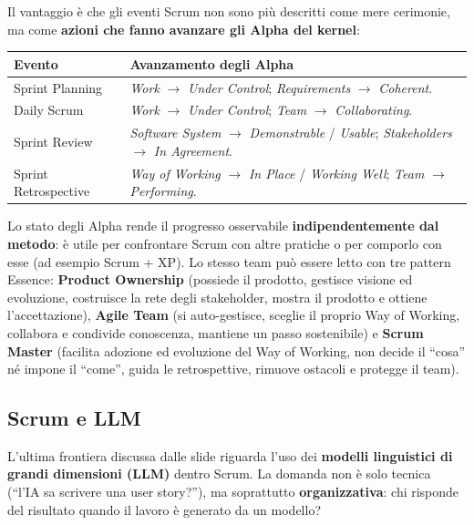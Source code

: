 \documentclass[12pt]{extarticle}
\begin{document}
\noindent Il vantaggio è che gli eventi Scrum non sono più descritti come mere cerimonie, ma come \textbf{azioni che fanno avanzare gli Alpha del kernel}:

\begin{center}
\small
\begin{tabular}{p{3.5cm}p{11.5cm}}
    \toprule
    \textbf{Evento} & \textbf{Avanzamento degli Alpha} \\
    \midrule
    Sprint Planning & \textit{Work} $\to$ \textit{Under Control}; \textit{Requirements} $\to$ \textit{Coherent}. \\
    \addlinespace
    Daily Scrum & \textit{Work} $\to$ \textit{Under Control}; \textit{Team} $\to$ \textit{Collaborating}. \\
    \addlinespace
    Sprint Review & \textit{Software System} $\to$ \textit{Demonstrable} / \textit{Usable}; \textit{Stakeholders} $\to$ \textit{In Agreement}. \\
    \addlinespace
    Sprint Retrospective & \textit{Way of Working} $\to$ \textit{In Place} / \textit{Working Well}; \textit{Team} $\to$ \textit{Performing}. \\
    \bottomrule
\end{tabular}
\end{center}

\noindent Lo stato degli Alpha rende il progresso osservabile \textbf{indipendentemente dal metodo}: è utile per confrontare Scrum con altre pratiche o per comporlo con esse (ad esempio Scrum + XP). Lo stesso team può essere letto con tre pattern Essence: \textbf{Product Ownership} (possiede il prodotto, gestisce visione ed evoluzione, costruisce la rete degli stakeholder, mostra il prodotto e ottiene l'accettazione), \textbf{Agile Team} (si auto-gestisce, sceglie il proprio Way of Working, collabora e condivide conoscenza, mantiene un passo sostenibile) e \textbf{Scrum Master} (facilita adozione ed evoluzione del Way of Working, non decide il ``cosa'' né impone il ``come'', guida le retrospettive, rimuove ostacoli e protegge il team).

\subsection{Scrum e LLM}

\noindent L'ultima frontiera discussa dalle slide riguarda l'uso dei \textbf{modelli linguistici di grandi dimensioni (LLM)} dentro Scrum. La domanda non è solo tecnica (``l'IA sa scrivere una user story?''), ma soprattutto \textbf{organizzativa}: chi risponde del risultato quando il lavoro è generato da un modello?
\end{document}
